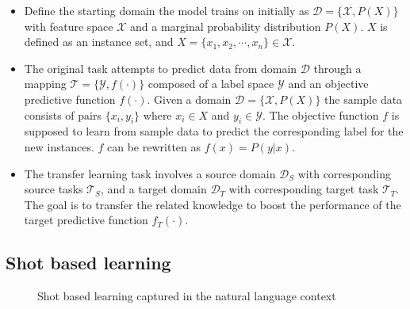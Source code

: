 \documentclass[11pt,twoside]{report}
\begin{document}
\begin{itemize}
  \item Define the starting domain the model trains on initially as $\mathcal{D} = \{\mathcal{X}, P(X)\}$ with feature space $\mathcal{X}$ and a marginal probability distribution $P(X)$. $X$ is defined as an instance set, and $X = \{x_1, x_2, \cdots, x_n\} \in \mathcal{X}$.
  
  \item The original task attempts to predict data from domain $\mathcal{D}$ through a mapping $\mathcal{T} = \{\mathcal{Y}, f(\cdot)\}$ composed of a label space $\mathcal{Y}$ and an objective predictive function $f(\cdot)$. Given a domain $\mathcal{D} = \{\mathcal{X}, P(X)\}$ the sample data consists of pairs $\{x_i, y_i\}$ where $x_i \in X$ and $y_i \in \mathcal{Y}$. The objective function $f$ is supposed to learn from sample data to predict the corresponding label for the new instances. $f$ can be rewritten as $f(x)=P(y|x)$.
  
  \item The transfer learning task involves a source domain $\mathcal{D}_S$ with corresponding source tasks $\mathcal{T}_S$, and a target domain $\mathcal{D}_T$ with corresponding target task $\mathcal{T}_T$. The goal is to transfer the related knowledge to boost the performance of the target predictive function $f_T(\cdot)$.
\end{itemize}

\subsection{Shot based learning}

\begin{figure}[H]
  \centering
  \caption{Shot based learning captured in the natural language context~\cite{openaishotbasedlearning}}
\end{figure}
\end{document}
